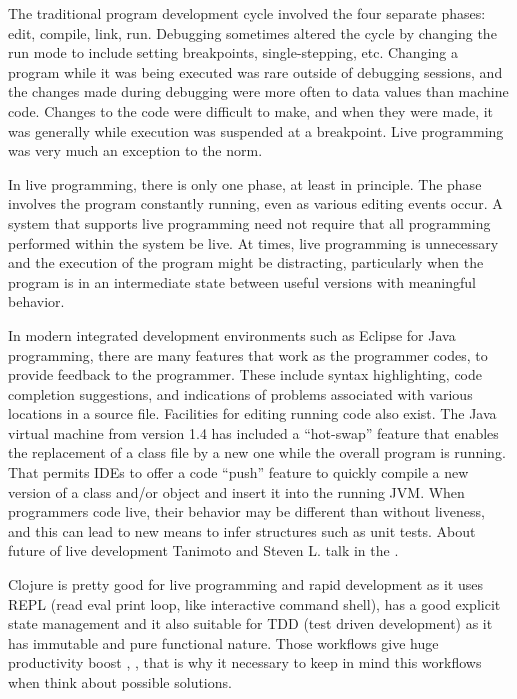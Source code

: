 The traditional program development cycle involved the four separate phases:
edit, compile, link, run. Debugging sometimes altered the cycle by changing the
run mode to include setting breakpoints, single-stepping, etc. Changing a
program while it was being executed was rare outside of debugging sessions, and
the changes made during debugging were more often to data values than machine
code. Changes to the code were difficult to make, and when they were made, it
was generally while execution was suspended at a breakpoint. Live programming
was very much an exception to the norm.

In live programming, there is only one phase, at least in principle. The phase
involves the program constantly running, even as various editing events occur. A
system that supports live programming need not require that all programming
performed within the system be live. At times, live programming is unnecessary
and the execution of the program might be distracting, particularly when the
program is in an intermediate state between useful versions with meaningful
behavior.

In modern integrated development environments such as Eclipse for Java
programming, there are many features that work as the programmer codes, to
provide feedback to the programmer. These include syntax highlighting, code
completion suggestions, and indications of problems associated with various
locations in a source file. Facilities for editing running code also exist. The
Java virtual machine from version 1.4 has included a “hot-swap” feature that
enables the replacement of a class file by a new one while the overall program
is running. That permits IDEs to offer a code “push” feature to quickly compile
a new version of a class and/or object and insert it into the running JVM. When
programmers code live, their behavior may be different than without liveness,
and this can lead to new means to infer structures such as unit tests. About
future of live development Tanimoto and Steven L. talk in the
\cite{tanimoto2013perspective}.

Clojure is pretty good for live programming and rapid development as it uses
REPL (read eval print loop, like interactive command shell), has a good explicit
state management and it also suitable for TDD (test driven development) as it
has immutable and pure functional nature. Those workflows give huge productivity
boost \cite{madeyski2007impact}, \cite{tanimoto2013perspective}, that is why it
necessary to keep in mind this workflows when think about possible solutions.


